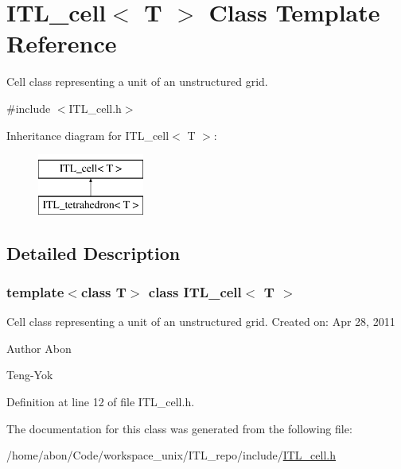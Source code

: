 \hypertarget{classITL__cell}{
\section{ITL\_\-cell$<$ T $>$ Class Template Reference}
\label{classITL__cell}
}


Cell class representing a unit of an unstructured grid.  




{\ttfamily \#include $<$ITL\_\-cell.h$>$}

Inheritance diagram for ITL\_\-cell$<$ T $>$:\begin{figure}[H]
\begin{center}
\leavevmode
\includegraphics[height=2cm]{classITL__cell}
\end{center}
\end{figure}


\subsection{Detailed Description}
\subsubsection*{template$<$class T$>$ class ITL\_\-cell$<$ T $>$}

Cell class representing a unit of an unstructured grid. Created on: Apr 28, 2011 \begin{DoxyAuthor}{Author}
Abon 

Teng-\/Yok 
\end{DoxyAuthor}


Definition at line 12 of file ITL\_\-cell.h.



The documentation for this class was generated from the following file:\begin{DoxyCompactItemize}
\item 
/home/abon/Code/workspace\_\-unix/ITL\_\-repo/include/\hyperlink{ITL__cell_8h}{ITL\_\-cell.h}\end{DoxyCompactItemize}

